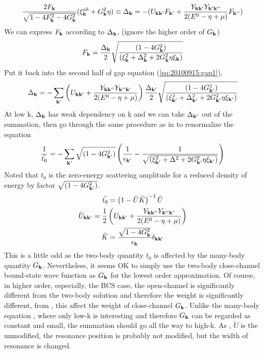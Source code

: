 \begin{equation}\label{eq:20100915:gap1}
\frac{2F_{\mathbf{k}}}{\sqrt{1-4 F_{\mathbf{k}}^2-4 G_{\mathbf{k}}^2}} (\xi^{ab}_{\mathbf{k}}+  G_{\mathbf{k}}^2\eta)\equiv\Delta_{\mathbf{k}}=-(U_{\mathbf{k}\mathbf{k}'}F_{\mathbf{k}'}+\frac{Y_{\mathbf{k}\mathbf{k}'}Y_{\mathbf{k}'\mathbf{k}''}}{2(E^{0}-\eta+\mu)}F_{\mathbf{k}''})
\end{equation}
We can express $F_{\mathbf{k}}$ according to $\Delta_{\mathbf{k}}$,  (ignore the higher order of $G_{\mathbf{k}}$)
\begin{equation}
F_{\mathbf{k}}=\frac{\Delta_{\mathbf{k}}}2\sqrt{\frac{(1-4G_{\mathbf{k}}^{2})}{(\xi_{\mathbf{k}}^{2}+\Delta_{\mathbf{k}}^{2}+2G_{\mathbf{k}}^{2}\eta\xi_{\mathbf{k}})}}
\end{equation}
Put it back into the second half of gap equation (\ref{eq:20100915:gap1}), 
\[
\Delta_{\mathbf{k}}=-\sum_{\mathbf{k}'}\left(U_{\mathbf{k}\mathbf{k}'}+\frac{Y_{\mathbf{k}\mathbf{k}''}Y_{\mathbf{k}''\mathbf{k}'}}{2(E^{0}-\eta+\mu)}\right)\frac{\Delta_{\mathbf{k}'}}2\sqrt{\frac{(1-4G_{\mathbf{k}'}^{2})}{(\xi_{\mathbf{k}'}^{2}+\Delta_{\mathbf{k}'}^{2}+2G_{\mathbf{k}'}^{2}\eta\xi_{\mathbf{k}'})}}
\]
At low k, $\Delta_{\mathbf{k}}$ has weak dependency on k and we can take $\Delta_{\mathbf{k}'}$ out of the summation,  then go through the same procedure as in \cite{Leggett,Fetter} to renormalize the equation
\begin{equation}\label{eq:20100915:renormGap}
\frac{1}{\tilde{t_{0}}}=-\sum_{\mathbf{k}'}\sqrt{(1-4G_{\mathbf{k}'}^{2})}
\left(\frac{1}{\epsilon_{\mathbf{k}'}}-\frac{1}{\sqrt{(\xi_{\mathbf{k}'}^{2}+\Delta^{2}+2G_{\mathbf{k}'}^{2}\eta\xi_{\mathbf{k}'})}}\right)
\end{equation}
Noted that $t_{0}$ is the zero-energy scattering amplitude for a reduced density of energy by factor $\sqrt{(1-4G_{\mathbf{k}'}^{2})}$.  
\begin{gather}
\tilde{t_{0}}=\left(1-\tilde{U}\tilde{ K}\right)^{-1}\tilde{U}\label{eq:20100915:t0}\\
\tilde{U}_{\mathbf{k}\mathbf{k}'}=\frac{1}{2} \left(U_{\mathbf{k}\mathbf{k}'}+\frac{Y_{\mathbf{k}\mathbf{k}''}Y_{\mathbf{k}''\mathbf{k}'}}{2(E^{0}-\eta+\mu)}\right)\label{eq:20100915:tu}\\
\tilde{K}=\frac{\sqrt{1-4G_{\mathbf{k}}^{2}}}{\epsilon_{\mathbf{k}}}\delta_{\mathbf{k}\mathbf{k}'}\label{eq:20100915:tk}
\end{gather}
This is a little odd as the two-body quantity $t_{0}$ is affected by the many-body quantity $G_{\mathbf{k}}$.  Nevertheless, it seems OK to simply use the two-body close-channel bound-state wave function as $G_{\mathbf{k}}$ for the lowest order approximation.   Of course, in higher order, especially, the BCS case, the open-channel is significantly different from the two-body solution and therefore the weight is significantly different, from , this affect the weight of close-channel $G_{\mathbf{k}}$.  Unlike the many-body equation , where only low-k is interesting and therefore $G_{\mathbf{k}}$ can be regarded as constant and small, the summation should go all the way to high-k.  As , $\tilde{U}$ is the unmodified, the resonance position is probably not modified, but the width of resonance is changed.  



